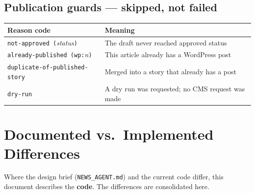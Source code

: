 \documentclass[11pt,a4paper]{article}
\newcommand{\file}[1]{\textcolor{aitkGray}{\texttt{\footnotesize\hyphenpenalty=0\exhyphenpenalty=0\relax #1}}}
\newcommand{\brk}{\hyphenpenalty=0\exhyphenpenalty=0\relax}
\newcommand{\code}[1]{\texttt{\small\brk #1}}
\begin{document}
\subsection{Publication guards --- skipped, not failed}

\begin{center}
\footnotesize
\begin{tabularx}{\textwidth}{@{}>{\RaggedRight}p{5.6cm} >{\RaggedRight}X@{}}
\toprule
\textbf{Reason code} & \textbf{Meaning} \\
\midrule
\code{not-approved (}\textit{status}\code{)} & The draft never reached approved status \\
\code{already-published (wp:}\textit{n}\code{)} & This article already has a WordPress post \\
\code{duplicate-of-}\allowbreak\code{published-story} & Merged into a story that already has a post \\
\code{dry-run} & A dry run was requested; no CMS request was made \\
\bottomrule
\end{tabularx}
\end{center}

\clearpage
\section{Documented vs.\ Implemented Differences}
\label{app:deviations}

Where the design brief (\file{NEWS\_AGENT.md}) and the current code differ, this
document describes the \textbf{code}. The differences are consolidated here.
\end{document}
